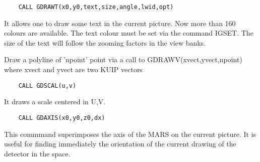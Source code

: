 \begin{verbatim}
    CALL GDRAWT(x0,y0,text,size,angle,lwid,opt)
\end{verbatim}
   \par
It allows one to draw some text in the current picture.  Now more than 160 
   colours are available. The text colour must be set via the command IGSET. 
   The size of the text will follow the zooming factors in the view banks.  

\ENDCMD


\BEGARG
{}
\ENDARG

   \par
Draw a polyline of 'npoint' point via a call to GDRAWV(xvect,yvect,npoint) 
   where xvect and yvect are two KUIP vectors 

\ENDCMD


\BEGARG
{}
\ENDARG

\begin{verbatim}
    CALL GDSCAL(u,v)
\end{verbatim}
   \par
It draws a scale centered in U,V.  

\ENDCMD


\BEGARG
{}
\ENDARG

\begin{verbatim}
    CALL GDAXIS(x0,y0,z0,dx)
\end{verbatim}
   \par
This commmand superimposes the axis of the MARS on the current picture. It 
   is useful for finding immediately the orientation of the current drawing of 
   the detector in the space.  

\ENDCMD


\BEGARG
{}
\ENDARG
{}
\ENDOPT


